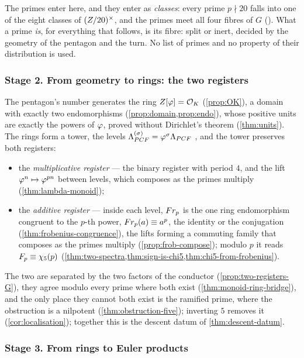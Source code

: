 The primes enter here, and they enter as \emph{classes}: every prime $p\nmid20$
falls into one of the eight classes of $(Z/20)^{\times}$, and the primes meet all four fibres of
$G$ ().  What a prime \emph{is}, for everything that follows, is its fibre: split or
inert, decided by the geometry of the pentagon and the turn.  No list of primes and
no property of their distribution is used.

\subsubsection{Stage 2. From geometry to rings: the two registers}\label{ssec:stage2}

The pentagon's number generates the ring $Z[\varphi]=\mathcal{O}_K$ (\cref{prop:OK}), a domain with
exactly two endomorphisms (\cref{prop:domain,prop:endo}), whose positive units are
exactly the powers of $\varphi$, proved without Dirichlet's theorem
(\cref{thm:units}).  The rings form a tower, the levels
$\Lambda_{PCF}^{(\sigma)}=\varphi^{\sigma}\Lambda_{PCF}$ \cite[\S2.8, \S3.4]{gonzalez26cw}, and the tower
preserves both registers:
\begin{itemize}
  \item the \emph{multiplicative register} --- the binary register with period $4$,
    and the lift $\varphi^n\mapsto\varphi^{pn}$ between levels, which composes as the
    primes multiply (\cref{thm:lambda-monoid});
  \item the \emph{additive register} --- inside each level, $Fr_p$ is the one ring endomorphism congruent to the $p$-th power, $Fr_p(a)\equiv a^p$, the identity or the conjugation (\cref{thm:frobenius-congruence}), the lifts
forming a commuting family that composes as the primes multiply
(\cref{prop:frob-compose}); modulo $p$
    it reads $F_p\equiv\chi_5(p)$ (\cref{thm:two-spectra,thm:sign-is-chi5,thm:chi5-from-frobenius}).
\end{itemize}
The two are separated by the two factors of the conductor
(\cref{prop:two-registers-G}), they agree modulo every prime where both exist
(\cref{thm:monoid-ring-bridge}), and the only place they cannot both exist is the
ramified prime, where the obstruction is a nilpotent (\cref{thm:obstruction-five});
inverting $5$ removes it (\cref{cor:localisation}); together this is the descent datum of \cref{thm:descent-datum}.

\subsubsection{Stage 3. From rings to Euler products}\label{ssec:stage3}

